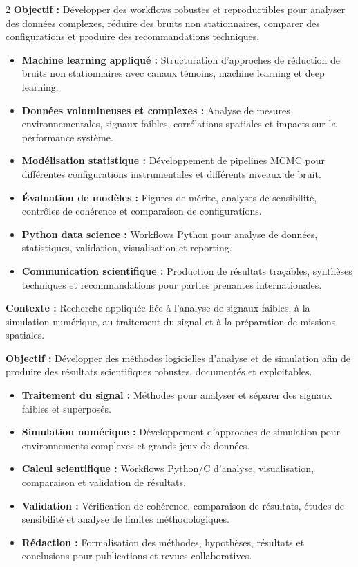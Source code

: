 \documentclass[8pt,a4paper,ragged2e,withhyper]{altacv}
\begin{document}
\begin{paracol}{2}
\textbf{Objectif :} Développer des workflows robustes et reproductibles pour analyser des données complexes, réduire des bruits non stationnaires, comparer des configurations et produire des recommandations techniques.

\begin{itemize}
  \item \textbf{Machine learning appliqué :} Structuration d’approches de réduction de bruits non stationnaires avec canaux témoins, machine learning et deep learning.
  \item \textbf{Données volumineuses et complexes :} Analyse de mesures environnementales, signaux faibles, corrélations spatiales et impacts sur la performance système.
  \item \textbf{Modélisation statistique :} Développement de pipelines MCMC pour différentes configurations instrumentales et différents niveaux de bruit.
  \item \textbf{Évaluation de modèles :} Figures de mérite, analyses de sensibilité, contrôles de cohérence et comparaison de configurations.
  \item \textbf{Python data science :} Workflows Python pour analyse de données, statistiques, validation, visualisation et reporting.
  \item \textbf{Communication scientifique :} Production de résultats traçables, synthèses techniques et recommandations pour parties prenantes internationales.
\end{itemize}

\divider


\textbf{Contexte :} Recherche appliquée liée à l’analyse de signaux faibles, à la simulation numérique, au traitement du signal et à la préparation de missions spatiales.

\textbf{Objectif :} Développer des méthodes logicielles d’analyse et de simulation afin de produire des résultats scientifiques robustes, documentés et exploitables.

\begin{itemize}
  \item \textbf{Traitement du signal :} Méthodes pour analyser et séparer des signaux faibles et superposés.
  \item \textbf{Simulation numérique :} Développement d’approches de simulation pour environnements complexes et grands jeux de données.
  \item \textbf{Calcul scientifique :} Workflows Python/C d’analyse, visualisation, comparaison et validation de résultats.
  \item \textbf{Validation :} Vérification de cohérence, comparaison de résultats, études de sensibilité et analyse de limites méthodologiques.
  \item \textbf{Rédaction :} Formalisation des méthodes, hypothèses, résultats et conclusions pour publications et revues collaboratives.
\end{itemize}


\end{paracol}
\end{document}
